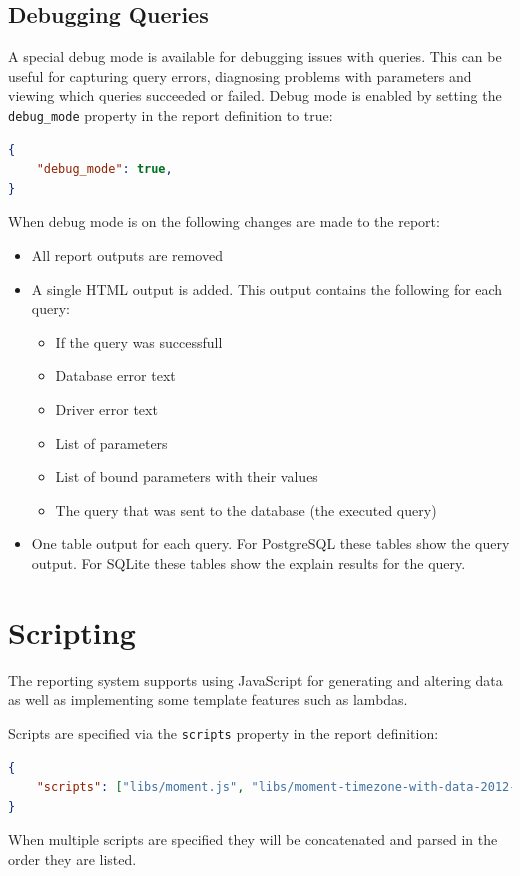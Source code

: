 \documentclass[a4paper,10pt]{book}
\begin{document}
\section{Debugging Queries}
A special debug mode is available for debugging issues with queries. This can be useful for capturing query errors, diagnosing problems with parameters and viewing which queries succeeded or failed. Debug mode is enabled by setting the \verb|debug_mode| property in the report definition to true:
\begin{lstlisting}[language=json]
{
	"debug_mode": true,
}
\end{lstlisting}

When debug mode is on the following changes are made to the report:
\begin{itemize}
\item All report outputs are removed
\item A single HTML output is added. This output contains the following for each query:
\begin{itemize}
\item If the query was successfull
\item Database error text
\item Driver error text
\item List of parameters
\item List of bound parameters with their values
\item The query that was sent to the database (the executed query)
\end{itemize}
\item One table output for each query. For PostgreSQL these tables show the query output. For SQLite these tables show the explain results for the query.
\end{itemize}

\chapter{Scripting}
The reporting system supports using JavaScript for generating and altering data as well as implementing some template features such as lambdas.

Scripts are specified via the \verb|scripts| property in the report definition:
\begin{lstlisting}[language=json]
{
	"scripts": ["libs/moment.js", "libs/moment-timezone-with-data-2012-2022.js", "solar_gen.js", "lat_long.js", "report.js"],
}
\end{lstlisting}
When multiple scripts are specified they will be concatenated and parsed in the order they are listed.
\end{document}
